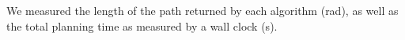 We measured the length of the path returned by each algorithm (rad),
as well as the total planning time as measured by a wall clock (s).




